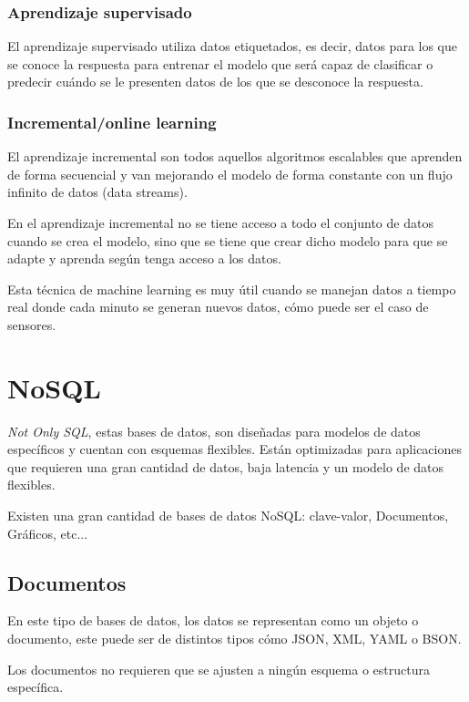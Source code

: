 \subsubsection{Aprendizaje supervisado}
El aprendizaje supervisado utiliza datos etiquetados, es decir, datos para los que se conoce la respuesta para entrenar el modelo que será capaz de clasificar o predecir cuándo se le presenten datos de los que se desconoce la respuesta. 


\subsubsection{Incremental/online learning}

El aprendizaje incremental son todos aquellos algoritmos escalables que aprenden de forma secuencial y van mejorando el modelo de forma constante con un flujo infinito de datos (data streams).

En el aprendizaje incremental no se tiene acceso a todo el conjunto de datos cuando se crea el modelo, sino que se tiene que crear dicho modelo para que se adapte y aprenda según tenga acceso a los datos. 

Esta técnica de machine learning es muy útil cuando se manejan datos a tiempo real donde cada minuto se generan nuevos datos, cómo puede ser el caso de sensores.\cite{gepperth:hal-01418129}


\section{NoSQL}

\textit{Not Only SQL}, estas bases de datos, son diseñadas para modelos de datos específicos y cuentan con esquemas flexibles. Están optimizadas para aplicaciones que requieren una gran cantidad de datos, baja latencia y un modelo de datos flexibles.

Existen una gran cantidad de bases de datos NoSQL: clave-valor, Documentos, Gráficos, etc...

\subsection{Documentos}

En este tipo de bases de datos, los datos se representan como un objeto o documento, este puede ser de distintos tipos cómo JSON, XML, YAML o BSON.\cite{pagina:AWS_NoSQL}

Los documentos no requieren que se ajusten a ningún esquema o estructura específica.

